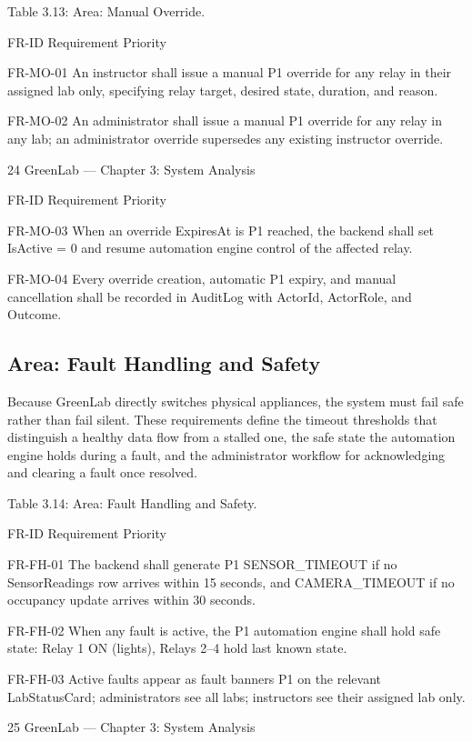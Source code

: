 Table 3.13: Area: Manual Override.

FR-ID Requirement Priority

FR-MO-01 An instructor shall issue a manual P1
override for any relay in their assigned
lab only, specifying relay target,
desired state, duration, and reason.

FR-MO-02 An administrator shall issue a manual P1
override for any relay in any lab; an
administrator override supersedes any
existing instructor override.




24
GreenLab --- Chapter 3: System Analysis


FR-ID Requirement Priority

FR-MO-03 When an override ExpiresAt is P1
reached, the backend shall set IsActive
= 0 and resume automation engine
control of the affected relay.

FR-MO-04 Every override creation, automatic P1
expiry, and manual cancellation shall
be recorded in AuditLog with ActorId,
ActorRole, and Outcome.


\subsection{Area: Fault Handling and Safety}

Because GreenLab directly switches physical appliances, the system must fail safe rather than fail
silent. These requirements define the timeout thresholds that distinguish a healthy data flow from a
stalled one, the safe state the automation engine holds during a fault, and the administrator
workflow for acknowledging and clearing a fault once resolved.

Table 3.14: Area: Fault Handling and Safety.

FR-ID Requirement Priority

FR-FH-01 The backend shall generate P1
SENSOR_TIMEOUT if no
SensorReadings row arrives within 15
seconds, and CAMERA_TIMEOUT if
no occupancy update arrives within 30
seconds.

FR-FH-02 When any fault is active, the P1
automation engine shall hold safe
state: Relay 1 ON (lights), Relays 2--4
hold last known state.

FR-FH-03 Active faults appear as fault banners P1
on the relevant LabStatusCard;
administrators see all labs; instructors
see their assigned lab only.




25
GreenLab --- Chapter 3: System Analysis


